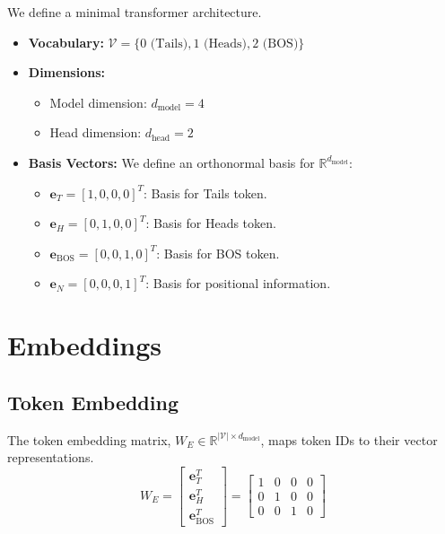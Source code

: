 \documentclass{article}
\begin{document}
We define a minimal transformer architecture.
\begin{itemize}
    \item \textbf{Vocabulary:} $\mathcal{V} = \{0 \text{ (Tails)}, 1 \text{ (Heads)}, 2 \text{ (BOS)}\}$
    \item \textbf{Dimensions:}
        \begin{itemize}
            \item Model dimension: $d_{\text{model}} = 4$
            \item Head dimension: $d_{\text{head}} = 2$
        \end{itemize}
    \item \textbf{Basis Vectors:} We define an orthonormal basis for $\mathbb{R}^{d_{\text{model}}}$:
    \begin{itemize}
        \item $\mathbf{e}_T = [1, 0, 0, 0]^T$: Basis for Tails token.
        \item $\mathbf{e}_H = [0, 1, 0, 0]^T$: Basis for Heads token.
        \item $\mathbf{e}_{\text{BOS}} = [0, 0, 1, 0]^T$: Basis for BOS token.
        \item $\mathbf{e}_N = [0, 0, 0, 1]^T$: Basis for positional information.
    \end{itemize}
\end{itemize}

\section{Embeddings}

\subsection{Token Embedding}
The token embedding matrix, $W_E \in \mathbb{R}^{|\mathcal{V}| \times d_{\text{model}}}$, maps token IDs to their vector representations.
\begin{equation}
    W_E = \begin{bmatrix}
        \mathbf{e}_T^T \\
        \mathbf{e}_H^T \\
        \mathbf{e}_{\text{BOS}}^T
    \end{bmatrix} = \begin{bmatrix}
        1 & 0 & 0 & 0 \\
        0 & 1 & 0 & 0 \\
        0 & 0 & 1 & 0
    \end{bmatrix}
\end{equation}
\end{document}
